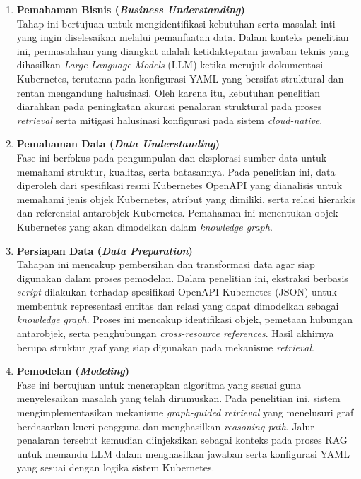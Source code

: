 \begin{enumerate}
    \item \textbf{Pemahaman Bisnis (\textit{Business Understanding})} \\
    Tahap ini bertujuan untuk mengidentifikasi kebutuhan serta masalah inti yang ingin diselesaikan melalui pemanfaatan data. Dalam konteks penelitian ini, permasalahan yang diangkat adalah ketidaktepatan jawaban teknis yang dihasilkan \textit{Large Language Models} (LLM) ketika merujuk dokumentasi Kubernetes, terutama pada konfigurasi YAML yang bersifat struktural dan rentan mengandung halusinasi. Oleh karena itu, kebutuhan penelitian diarahkan pada peningkatan akurasi penalaran struktural pada proses \textit{retrieval} serta mitigasi halusinasi konfigurasi pada sistem \textit{cloud-native}.

    \item \textbf{Pemahaman Data (\textit{Data Understanding})} \\
    Fase ini berfokus pada pengumpulan dan eksplorasi sumber data untuk memahami struktur, kualitas, serta batasannya. Pada penelitian ini, data diperoleh dari spesifikasi resmi Kubernetes OpenAPI yang dianalisis untuk memahami jenis objek Kubernetes, atribut yang dimiliki, serta relasi hierarkis dan referensial antarobjek Kubernetes. Pemahaman ini menentukan objek Kubernetes yang akan dimodelkan dalam \textit{knowledge graph}.

    \item \textbf{Persiapan Data (\textit{Data Preparation})} \\
    Tahapan ini mencakup pembersihan dan transformasi data agar siap digunakan dalam proses pemodelan. Dalam penelitian ini, ekstraksi berbasis \textit{script} dilakukan terhadap spesifikasi OpenAPI Kubernetes (JSON) untuk membentuk representasi entitas dan relasi yang dapat dimodelkan sebagai \textit{knowledge graph}. Proses ini mencakup identifikasi objek, pemetaan hubungan antarobjek, serta penghubungan \textit{cross-resource references}. Hasil akhirnya berupa struktur graf yang siap digunakan pada mekanisme \textit{retrieval}.

    \item \textbf{Pemodelan (\textit{Modeling})} \\
    Fase ini bertujuan untuk menerapkan algoritma yang sesuai guna menyelesaikan masalah yang telah dirumuskan. Pada penelitian ini, sistem mengimplementasikan mekanisme \textit{graph-guided retrieval} yang menelusuri graf berdasarkan kueri pengguna dan menghasilkan \textit{reasoning path}. Jalur penalaran tersebut kemudian diinjeksikan sebagai konteks pada proses RAG untuk memandu LLM dalam menghasilkan jawaban serta konfigurasi YAML yang sesuai dengan logika sistem Kubernetes.


\end{enumerate}
